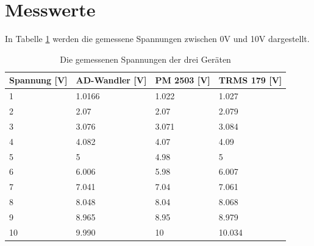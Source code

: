 \documentclass[12pt, oneside, a4paper, \docLanguage]{report}
\begin{document}
\newpage
\section{Messwerte}
\label{chap:VERSUCH_1_MESSWERTE}

In Tabelle \ref{fig:VERSUCH_1_messungen} werden die gemessene Spannungen zwischen 0V und 10V dargestellt.

\begin{table}[H]
\centering
\begin{tabular}{|l|l|l|l|}
\hline
\multicolumn{1}{|c|}{\textbf{Spannung {[}V{]}}} & \textbf{AD-Wandler {[}V{]}} & \textbf{PM 2503 {[}V{]}} & \textbf{TRMS 179 {[}V{]}} \\ \hline
1                                               & 1.0166                      & 1.022                    & 1.027             \\ \hline
2                                               & 2.07                        & 2.07                     & 2.079             \\ \hline
3                                               & 3.076                       & 3.071                    & 3.084             \\ \hline
4                                               & 4.082                       & 4.07                     & 4.09              \\ \hline
5                                               & 5                           & 4.98                     & 5                 \\ \hline
6                                               & 6.006                       & 5.98                     & 6.007             \\ \hline
7                                               & 7.041                       & 7.04                     & 7.061             \\ \hline
8                                               & 8.048                       & 8.04                     & 8.068             \\ \hline
9                                               & 8.965                       & 8.95                     & 8.979             \\ \hline
10                                              & 9.990                       & 10                       & 10.034            \\ \hline
\end{tabular}
\caption{Die gemessenen Spannungen der drei Geräten}
\label{fig:VERSUCH_1_messungen}
\end{table}
\end{document}
